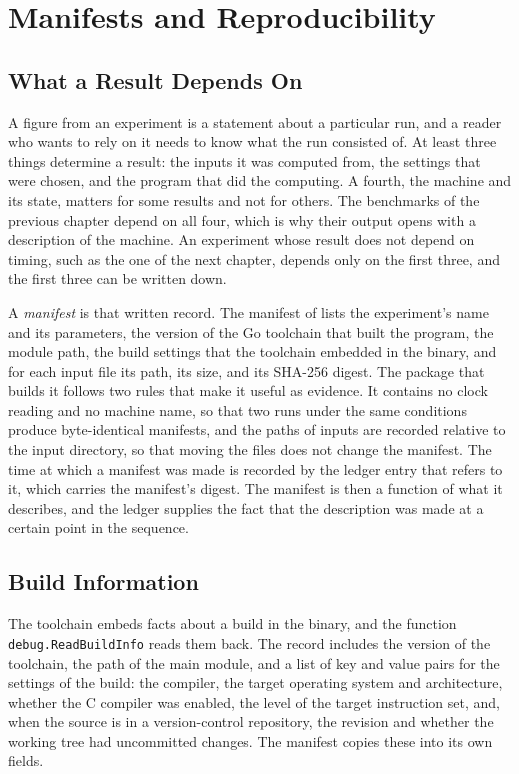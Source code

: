 \chapter{Manifests and Reproducibility}
\label{ch:manifests}

\section{What a Result Depends On}

A figure from an experiment is a statement about a particular run, and a reader who wants to rely on it needs to know what the run consisted of. At least three things determine a result: the inputs it was computed from, the settings that were chosen, and the program that did the computing. A fourth, the machine and its state, matters for some results and not for others. The benchmarks of the previous chapter depend on all four, which is why their output opens with a description of the machine. An experiment whose result does not depend on timing, such as the one of the next chapter, depends only on the first three, and the first three can be written down.

A \emph{manifest} is that written record. The manifest of \golab{} lists the experiment's name and its parameters, the version of the Go toolchain that built the program, the module path, the build settings that the toolchain embedded in the binary, and for each input file its path, its size, and its SHA-256 digest. The package that builds it follows two rules that make it useful as evidence. It contains no clock reading and no machine name, so that two runs under the same conditions produce byte-identical manifests, and the paths of inputs are recorded relative to the input directory, so that moving the files does not change the manifest. The time at which a manifest was made is recorded by the ledger entry that refers to it, which carries the manifest's digest. The manifest is then a function of what it describes, and the ledger supplies the fact that the description was made at a certain point in the sequence.


\section{Build Information}

The toolchain embeds facts about a build in the binary, and the function \texttt{debug.\allowbreak ReadBuildInfo} reads them back. The record includes the version of the toolchain, the path of the main module, and a list of key and value pairs for the settings of the build: the compiler, the target operating system and architecture, whether the C compiler was enabled, the level of the target instruction set, and, when the source is in a version-control repository, the revision and whether the working tree had uncommitted changes. The manifest copies these into its own fields.

